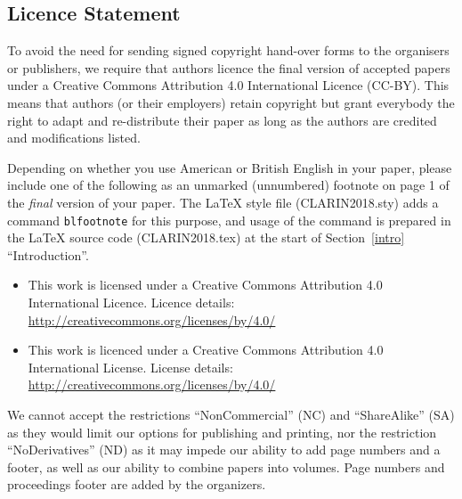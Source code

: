 \documentclass{clarin}
\begin{document}
{\subsection{Licence Statement}
\label{licence}

To avoid the need for sending signed copyright hand-over forms to the
organisers or publishers, we require that authors licence the final version
of accepted papers under a
Creative Commons Attribution 4.0 International Licence
(CC-BY).
This means that authors (or their employers) retain copyright but
grant everybody
the right to adapt and re-distribute their paper
as long as the authors are credited and modifications listed. %

Depending on whether you use American or British English in your
paper, please include one of the following as an unmarked
(unnumbered) footnote on page 1 of the \emph{final} version of your paper.
The LaTeX style file (CLARIN2018.sty) adds a command
\texttt{blfootnote} for this purpose, and usage of the command is
prepared in the LaTeX source code (CLARIN2018.tex) at the start
of Section~\ref{intro} ``Introduction''.

\begin{itemize}
    \item  This work is licensed under a Creative Commons
           Attribution 4.0 International Licence.
           Licence details:
           \url{http://creativecommons.org/licenses/by/4.0/}
    \item  This work is licenced under a Creative Commons
           Attribution 4.0 International License.
           License details:
           \url{http://creativecommons.org/licenses/by/4.0/}
\end{itemize}


We cannot accept the restrictions ``NonCommercial'' (NC) and
``ShareAlike'' (SA) as they would
limit our options for publishing and printing,
nor the restriction ``NoDerivatives'' (ND) as it may impede our
ability to add page numbers and a footer, as well as our ability
to combine papers into volumes.
Page numbers and proceedings footer are added by the organizers.

}
\end{document}

